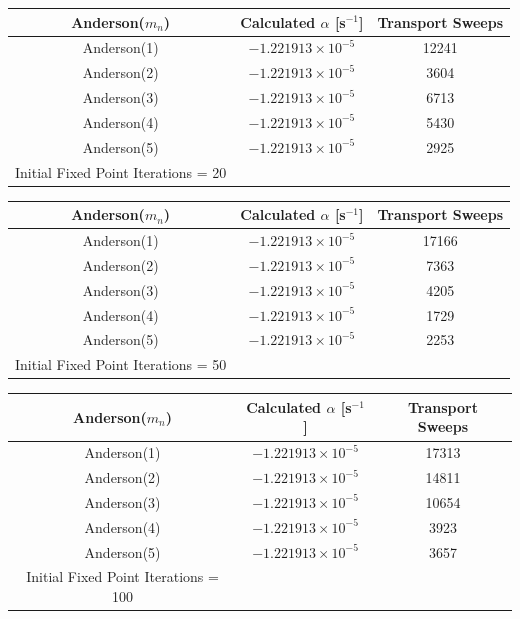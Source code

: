 \begin{table}[!htbp]\ContinuedFloat
	\begin{subtable}[h]{1.0\textwidth}
	\centering{}
	\begin{tabular}{@{}ccc@{}}\toprule
	Anderson($m_{n}$) & Calculated $\alpha$ [s$^{-1}$] & Transport Sweeps \\
	\midrule
	Anderson(1) & $-1.221913 \times 10^{-5}$ & 12241 \\
	Anderson(2) & $-1.221913 \times 10^{-5}$ & 3604  \\
	Anderson(3) & $-1.221913 \times 10^{-5}$ & 6713  \\
	Anderson(4) & $-1.221913 \times 10^{-5}$ & 5430  \\
	Anderson(5) & $-1.221913 \times 10^{-5}$ & 2925  \\
	\bottomrule
	Initial Fixed Point Iterations = 20
	\end{tabular}
	\end{subtable}%
	\vspace{0.25cm}
	\begin{subtable}[h]{1.0\textwidth}
	\centering{}
	\begin{tabular}{@{}ccc@{}}\toprule
	Anderson($m_{n}$) & Calculated $\alpha$ [s$^{-1}$] & Transport Sweeps \\
	\midrule
	Anderson(1) & $-1.221913 \times 10^{-5}$ & 17166 \\
	Anderson(2) & $-1.221913 \times 10^{-5}$ & 7363 \\
	Anderson(3) & $-1.221913 \times 10^{-5}$ & 4205 \\
	Anderson(4) & $-1.221913 \times 10^{-5}$ & 1729 \\
	Anderson(5) & $-1.221913 \times 10^{-5}$ & 2253 \\
	\bottomrule
	Initial Fixed Point Iterations = 50
	\end{tabular}
	\end{subtable}%
	\vspace{0.25cm}
	\begin{subtable}[h]{1.0\textwidth}
	\centering{}
	\begin{tabular}{@{}ccc@{}}\toprule
	Anderson($m_{n}$) & Calculated $\alpha$ [s$^{-1}$] & Transport Sweeps \\
	\midrule
	Anderson(1) & $-1.221913 \times 10^{-5}$ & 17313 \\
	Anderson(2) & $-1.221913 \times 10^{-5}$ & 14811 \\
	Anderson(3) & $-1.221913 \times 10^{-5}$ & 10654 \\
	Anderson(4) & $-1.221913 \times 10^{-5}$ & 3923 \\
	Anderson(5) & $-1.221913 \times 10^{-5}$ & 3657 \\
	\bottomrule
	Initial Fixed Point Iterations = 100
	\end{tabular}
	\end{subtable}
\end{table}

